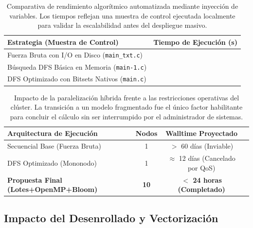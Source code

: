 \documentclass[12pt,a4paper]{tfg_domingo}
\begin{document}
\begin{table}[htb!]
\centering
\begin{tcolorbox}[title={Comparativa de Tiempos de Ejecución Local para Benchmarks de Control}]
\begin{tabular}{lc}
\textbf{Estrategia (Muestra de Control)} & \textbf{Tiempo de Ejecución (s)} \\ \hline
Fuerza Bruta con I/O en Disco (\texttt{main\_txt.c}) & \textbf{\tiempoAppText{}} \\
Búsqueda DFS Básica en Memoria (\texttt{main-1.c}) & \textbf{\tiempoAppOne{}} \\
DFS Optimizado con Bitsets Nativos (\texttt{main.c}) & \textbf{\tiempoAppOpt{}} \\ \hline
\end{tabular}
\end{tcolorbox}
\caption{Comparativa de rendimiento algorítmico automatizada mediante inyección de variables. Los tiempos reflejan una muestra de control ejecutada localmente para validar la escalabilidad antes del despliegue masivo.}
\label{tab:performance_local}
\end{table}

\begin{table}[htb!]
\centering
\begin{tcolorbox}[title={Proyección de Viabilidad Operativa en Altamira ($\ell=75$)}]
\begin{tabular}{lccc}
\textbf{Arquitectura de Ejecución} & \textbf{Nodos} & \textbf{Walltime Proyectado} \\ \hline
Secuencial Base (Fuerza Bruta) & 1 & $>$ 60 días (Inviable) \\
DFS Optimizado (Mononodo) & 1 & $\approx$ 12 días (Cancelado por QoS) \\
\textbf{Propuesta Final (Lotes+OpenMP+Bloom)} & \textbf{10} & \textbf{$<$ 24 horas (Completado)} \\ \hline
\end{tabular}
\end{tcolorbox}
\caption{Impacto de la paralelización híbrida frente a las restricciones operativas del clúster. La transición a un modelo fragmentado fue el único factor habilitante para concluir el cálculo sin ser interrumpido por el administrador de sistemas.}
\label{tab:performance_altamira}
\end{table}

\subsection{Impacto del Desenrollado y Vectorización}
\end{document}
